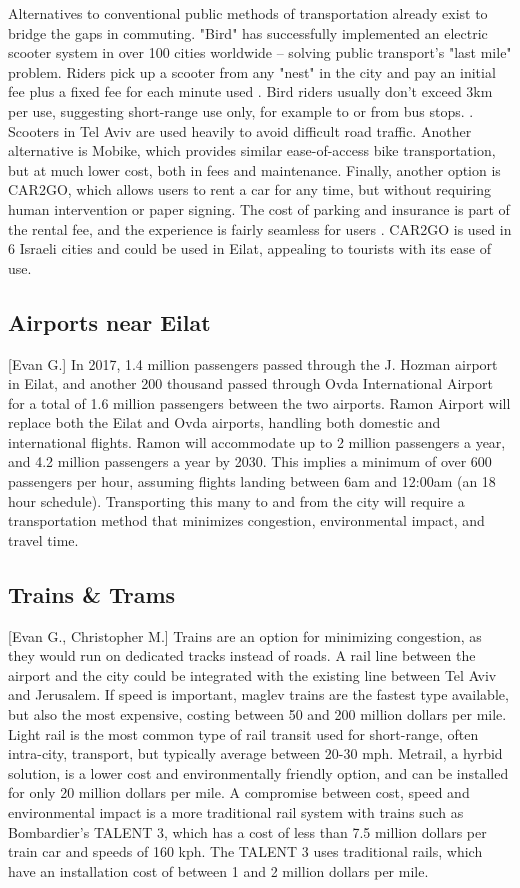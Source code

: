 \documentclass[12pt]{article}                         %
\begin{document}
Alternatives to conventional public methods of transportation already exist to bridge the gaps in commuting. "Bird" has successfully implemented an electric scooter system in over 100 cities worldwide -- solving public transport's "last mile" problem. Riders pick up a scooter from any "nest" in the city and pay an initial fee plus a fixed fee for each minute used \cite{BirdIsrael}. Bird riders usually don't exceed 3km per use, suggesting short-range use only, for example to or from bus stops. \cite{MichaelRaz-Chaimovich2018BirdGlobes}. Scooters  in Tel Aviv are used heavily to avoid difficult road traffic. Another alternative is Mobike, which provides similar ease-of-access bike transportation, but at much lower cost, both in fees and maintenance. Finally, another option is CAR2GO, which allows users to rent a car for any time, but without requiring human intervention or paper signing. The cost of parking and insurance is part of the rental fee, and the experience is fairly seamless for users \cite{OrenDoriandMeiravMoran2018IsraeliHaaretz.com}. CAR2GO is used in 6 Israeli cities and could be used in Eilat, appealing to tourists with its ease of use.

\subsection{Airports near Eilat}[Evan G.]
In 2017, 1.4 million passengers passed through the J. Hozman airport in Eilat, and another 200 thousand passed through Ovda International Airport for a total of 1.6 million passengers between the two airports. Ramon Airport will replace both the Eilat and Ovda airports, handling both domestic and international flights. Ramon will accommodate up to 2 million passengers a year, and 4.2 million passengers a year by 2030. This implies a minimum of over 600 passengers per hour, assuming flights landing between 6am and 12:00am (an 18 hour schedule). Transporting this many to and from the city will require a transportation method that minimizes congestion, environmental impact, and travel time.

\subsection{Trains \& Trams}[Evan G., Christopher M.]
Trains are an option for minimizing congestion, as they would run on dedicated tracks instead of roads. A rail line between the airport and the city could be integrated with the existing line between Tel Aviv and Jerusalem. If speed is important, maglev trains are the fastest type available, but also the most expensive, costing between 50 and 200 million dollars per mile. Light rail is the most common type of rail transit used for short-range, often intra-city, transport, but typically average between 20-30 mph. Metrail, a hyrbid solution, is a lower cost and environmentally friendly option, and can be installed for only 20 million dollars per mile. A compromise between cost, speed and environmental impact is a more traditional rail system with trains such as Bombardier's TALENT 3, which has a cost of less than 7.5 million dollars per train car and speeds of 160 kph. The TALENT 3 uses traditional rails, which have an installation cost of between 1 and 2 million dollars per mile.
\end{document}
